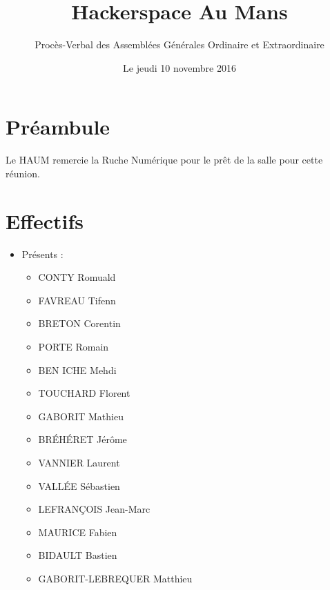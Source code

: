 \documentclass[a4paper, 11pt]{article}
\title{Hackerspace Au Mans}
\author{Procès-Verbal des Assemblées Générales Ordinaire et Extraordinaire}
\date{Le jeudi 10 novembre 2016}
\begin{document}
\maketitle

\section*{Préambule}

Le HAUM remercie la Ruche Numérique pour le prêt de la salle pour cette réunion.

\section{Effectifs}

\begin{itemize}
	\item Présents :
		\begin{itemize}
      \item CONTY Romuald
      \item FAVREAU Tifenn
      \item BRETON Corentin
      \item PORTE Romain
      \item BEN ICHE Mehdi
      \item TOUCHARD Florent
      \item GABORIT Mathieu
      \item BRÉHÉRET Jérôme
      \item VANNIER Laurent
      \item VALLÉE Sébastien
      \item LEFRANÇOIS Jean-Marc
      \item MAURICE Fabien
      \item BIDAULT Bastien
      \item GABORIT-LEBREQUER Matthieu


\end{itemize}
\end{itemize}
\end{document}
